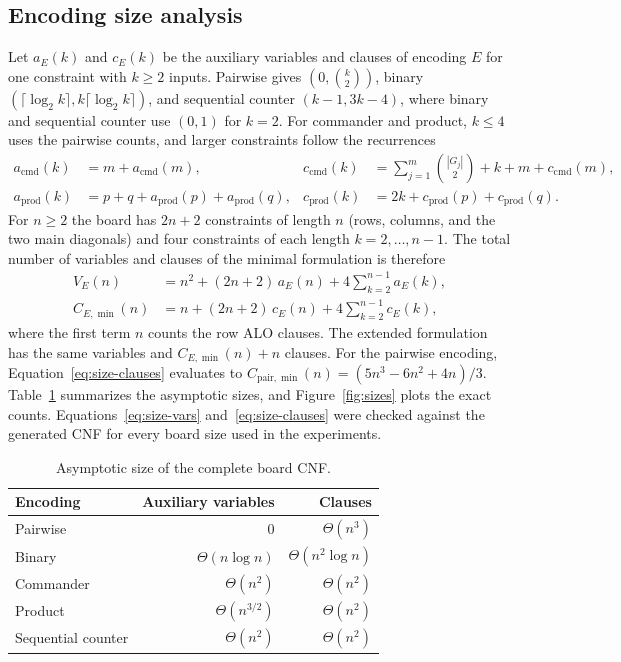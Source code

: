 \documentclass[a4paper,fleqn]{cas-sc}
\begin{document}
\subsection{Encoding size analysis}
Let $a_E(k)$ and $c_E(k)$ be the auxiliary variables and clauses of
encoding $E$ for one constraint with $k\ge2$ inputs. Pairwise gives
$(0,\binom k2)$, binary $(\lceil\log_2k\rceil,k\lceil\log_2k\rceil)$, and
sequential counter $(k-1,3k-4)$, where binary and sequential counter use
$(0,1)$ for $k=2$. For commander and product, $k\le4$ uses the pairwise
counts, and larger constraints follow the recurrences
\begin{align}
a_{\mathrm{cmd}}(k)&=m+a_{\mathrm{cmd}}(m), &
c_{\mathrm{cmd}}(k)&=\textstyle\sum_{j=1}^m\binom{|G_j|}{2}+k+m+c_{\mathrm{cmd}}(m),\\
a_{\mathrm{prod}}(k)&=p+q+a_{\mathrm{prod}}(p)+a_{\mathrm{prod}}(q), &
c_{\mathrm{prod}}(k)&=2k+c_{\mathrm{prod}}(p)+c_{\mathrm{prod}}(q).
\end{align}
For $n\ge2$ the board has $2n+2$ constraints of length $n$ (rows,
columns, and the two main diagonals) and four constraints of each length
$k=2,\ldots,n-1$. The total number of variables and clauses of the
minimal formulation is therefore
\begin{align}
V_E(n)&=n^2+(2n+2)\,a_E(n)+4\sum_{k=2}^{n-1}a_E(k),\label{eq:size-vars}\\
C_{E,\min}(n)&=n+(2n+2)\,c_E(n)+4\sum_{k=2}^{n-1}c_E(k),\label{eq:size-clauses}
\end{align}
where the first term $n$ counts the row ALO clauses. The extended
formulation has the same variables and $C_{E,\min}(n)+n$ clauses. For
the pairwise encoding, Equation~\eqref{eq:size-clauses} evaluates to
$C_{\mathrm{pair},\min}(n)=(5n^3-6n^2+4n)/3$. Table~\ref{tab:amo}
summarizes the asymptotic sizes, and Figure~\ref{fig:sizes} plots the
exact counts. Equations~\eqref{eq:size-vars} and~\eqref{eq:size-clauses}
were checked against the generated CNF for every board size used in the
experiments.
\begin{table}[pos=htbp]
\centering\small
\caption{Asymptotic size of the complete board CNF.}
\label{tab:amo}
\begin{tabular}{lrr}\toprule
Encoding & Auxiliary variables & Clauses\\\midrule
Pairwise & 0 & $\Theta(n^3)$\\
Binary & $\Theta(n\log n)$ & $\Theta(n^2\log n)$\\
Commander & $\Theta(n^2)$ & $\Theta(n^2)$\\
Product & $\Theta(n^{3/2})$ & $\Theta(n^2)$\\
Sequential counter & $\Theta(n^2)$ & $\Theta(n^2)$\\\bottomrule
\end{tabular}
\end{table}
\end{document}
